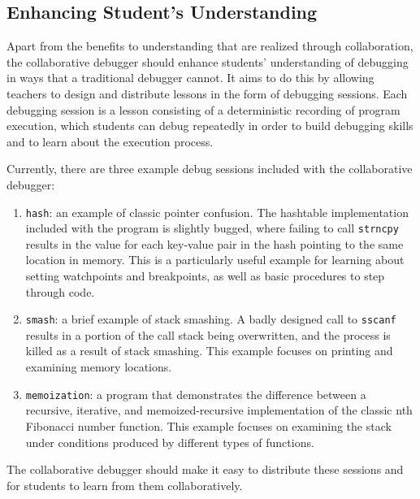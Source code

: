 \documentclass[12pt]{article}
\begin{document}
\subsection{Enhancing Student's Understanding}

Apart from the benefits to understanding that are realized through
collaboration, the collaborative debugger should enhance students'
understanding of debugging in ways that a traditional debugger cannot.
It aims to do this by allowing teachers to design and distribute
lessons in the form of debugging sessions.  Each debugging session is
a lesson consisting of a deterministic recording of program execution,
which students can debug repeatedly in order to build debugging skills
and to learn about the execution process.
\par

Currently, there are three example debug sessions included with the
collaborative debugger:

\begin{enumerate}
\item \lstinline{hash}: an example of classic pointer confusion.  The
  hashtable implementation included with the program is slightly
  bugged, where failing to call \lstinline{strncpy} results in the
  value for each key-value pair in the hash pointing to the same
  location in memory.  This is a particularly useful example for
  learning about setting watchpoints and breakpoints, as well as basic
  procedures to step through code.
\item \lstinline{smash}: a brief example of stack smashing.  A badly
  designed call to \lstinline{sscanf} results in a portion of the call
  stack being overwritten, and the process is killed as a result of
  stack smashing.  This example focuses on printing and examining
  memory locations.
\item \lstinline{memoization}: a program that demonstrates the
  difference between a recursive, iterative, and memoized-recursive
  implementation of the classic nth Fibonacci number function.  This
  example focuses on examining the stack under conditions produced by
  different types of functions.
\end{enumerate}

The collaborative debugger should make it easy to distribute these
sessions and for students to learn from them collaboratively.
\par
\end{document}
